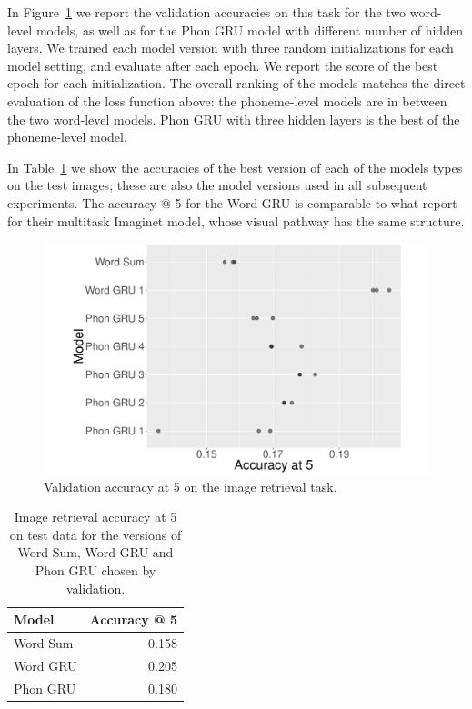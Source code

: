 In Figure~\ref{fig:accat5} we report the validation accuracies on this
task for the two word-level models, as well as for the Phon GRU
model with different number of hidden layers. We trained each model
version with three random initializations for each model setting, and
evaluate after each epoch. We report the score of the best epoch for
each initialization. 
The overall ranking of the models matches the direct
evaluation of the loss function above: the phoneme-level models are in
between the two word-level models. Phon GRU with three
hidden layers is the best of the phoneme-level model.

In Table~\ref{tab:accat5test} we show the accuracies of the best
version of each of the models types on the test images; these are also
the model versions used in all subsequent experiments. The accuracy @ 5 for the {\sc Word GRU} is comparable to what
 report for their multitask {\sc Imaginet}
model, whose visual pathway has the same structure.


\begin{figure}
  \centering
  \includegraphics[scale=0.25]{accat5.pdf}
  \caption{Validation accuracy at 5 on the image retrieval task.}
  \label{fig:accat5}
\end{figure}


\begin{table}
  \centering
  \begin{tabular}{l|r}
    Model & Accuracy @ 5 \\\hline
    {\sc Word Sum} & 0.158 \\
    {\sc Word GRU} & 0.205 \\
    {\sc Phon GRU} & 0.180 \\
  \end{tabular}
  \caption{Image retrieval accuracy at 5 on test data for the versions of {\sc Word
      Sum}, {\sc Word GRU} and {\sc Phon GRU} chosen by
    validation.}
  \label{tab:accat5test}
\end{table}

